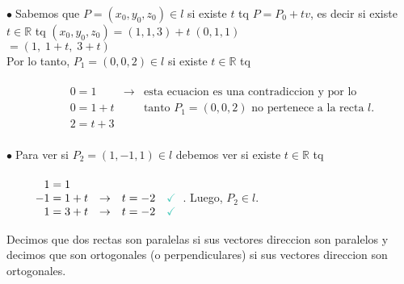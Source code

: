 \documentclass{article}
\theoremstyle{definition}
\theoremstyle{definition}
\theoremstyle{remark}
\newcommand\bl{$\bullet\;$}
\newcommand\ok{\checkmark}
\begin{document}
\bl Sabemos que $P=(x_0,y_0,z_0) \in l$ si existe $t$ tq $P=P_0 + tv$, es decir si existe $t \in \mathbb{R}$ tq \quad $(x_0,y_0,z_0)$\;$=(1,1,3)+t \; (0,1,1)$\\
\;$= (1,\; 1+t,\; 3+t)$ \\
Por lo tanto, $P_1=(0,0,2) \in l$ si existe $t \in \mathbb{R}$ tq  \\\\$
  \quad \quad \begin{array}{llc}
  \quad \quad \phantom{-} 0 =1  & \to & \text{esta ecuacion es una contradiccion y por lo}\\
  \quad \quad \phantom{-} 0 = 1 + t & & \text{tanto $P_1=(0,0,2)$ no pertenece a la recta $l$}.\\ 
 \quad \quad \phantom{-}2 = t+3
    \end{array}
$ \\\\
\bl Para ver si $P_2=(1,-1,1) \in l $ debemos ver si existe $t \in \mathbb{R}$ tq \\\\
$\begin{array}{llc}
 \quad \quad \phantom{-}1 = 1 & & \\
 \quad \quad   -1 = 1+t & \to & t=-2 \quad \textcolor{verdep2}{\ok} \\
  \quad \quad  \phantom{-}1 = 3+t & \to & t=-2 \quad \textcolor{verdep2}{\ok} \\
\end{array}$. Luego, $P_2 \in l$.
\pagebreak
\begin{defi}
  Decimos que dos rectas son paralelas si sus vectores direccion son paralelos y decimos que son ortogonales (o perpendiculares) si sus vectores direccion son ortogonales. 
\end{defi}
\end{document}
